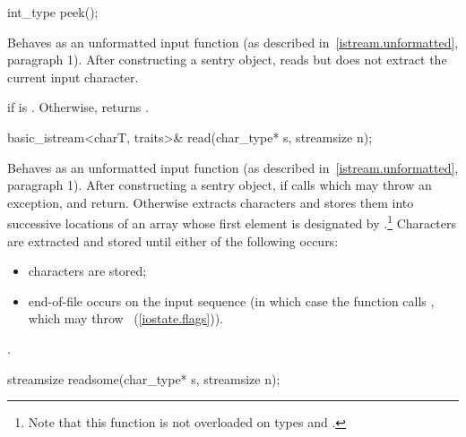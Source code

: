 %
\begin{itemdecl}
int_type peek();
\end{itemdecl}

\begin{itemdescr}
\pnum
\effects
Behaves as an unformatted input function
(as described in~\ref{istream.unformatted}, paragraph 1).
After constructing a sentry object, reads but does not extract
the current input character.

\pnum
\returns
{}
if
is
.
Otherwise, returns
.
\end{itemdescr}

%
\begin{itemdecl}
basic_istream<charT, traits>& read(char_type* s, streamsize n);
\end{itemdecl}

\begin{itemdescr}
\pnum
\effects
Behaves as an unformatted input function (as described in~\ref{istream.unformatted}, paragraph 1).
After constructing
a sentry object, if
calls
which may throw an exception,
and return.
Otherwise extracts characters and stores them
into successive locations of an array whose first element is designated by
.\footnote{Note that this function is not overloaded on types
and
.}
Characters are extracted and stored until either of the following occurs:
\begin{itemize}
\item
{} characters are stored;
\item
end-of-file occurs on the input sequence
(in which case the function calls
,
which may throw
~(\ref{iostate.flags})).
\end{itemize}

\pnum
\returns
{}.
\end{itemdescr}

%
\begin{itemdecl}
streamsize readsome(char_type* s, streamsize n);
\end{itemdecl}

